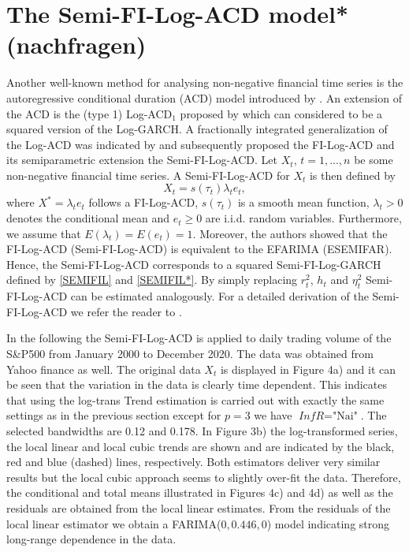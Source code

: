 \documentclass[12pt]{article}
\begin{document}
\section{The Semi-FI-Log-ACD model* (nachfragen)}
 Another well-known method for analysing non-negative financial time series is the autoregressive conditional duration (ACD) model introduced by \citet{engle1998autoregressive}. An extension of the ACD is the (type 1) Log-ACD$_1$ proposed by \citet{bauwens2008moments} which can considered to be a squared version of the Log-GARCH. A fractionally integrated generalization of the Log-ACD was indicated by \citet{beran2015modelling} and subsequently \citet{feng2015forecasting} proposed the FI-Log-ACD and its semiparametric extension the Semi-FI-Log-ACD. Let $X_t$, $t = 1,...,n$ be some non-negative financial time series. A Semi-FI-Log-ACD for $X_t$ is then defined by 
 \begin{equation}
 	X_t = s(\tau_t) \lambda_t e_t,
 \end{equation}
where $X^* = \lambda_t e_t$ follows a FI-Log-ACD, $s(\tau_t)$ is a smooth mean function, $\lambda_t > 0$ denotes the conditional mean and $e_t \geq 0$ are i.i.d. random variables. Furthermore, we assume that $E(\lambda_t) = E(e_t) = 1$. Moreover, the authors showed that the FI-Log-ACD (Semi-FI-Log-ACD) is equivalent to the EFARIMA (ESEMIFAR). Hence, the Semi-FI-Log-ACD corresponds to a squared Semi-FI-Log-GARCH defined by \eqref{SEMIFIL} and \eqref{SEMIFIL*}. By simply replacing $r_t^2$, $h_t$ and $\eta_t^2$ Semi-FI-Log-ACD can be estimated analogously. For a detailed derivation of the Semi-FI-Log-ACD we refer the reader to \citet{feng2015forecasting}.

 In the following the Semi-FI-Log-ACD is applied to daily trading volume of the S\&P500 from January 2000 to December 2020. The data was obtained from Yahoo finance as well. The original data $X_t$ is displayed in Figure 4a) and it can be seen that the variation in the data is clearly time dependent. This indicates that using the log-trans Trend estimation is carried out with exactly the same settings as in the previous section except for $p=3$ we have $\textit{InfR} = \text{"Nai"}$. The selected bandwidths are 0.12 and 0.178. In Figure 3b) the log-transformed series, the local linear and local cubic trends are shown and are indicated by the black, red and blue (dashed) lines, respectively. Both estimators deliver very similar results but the local cubic approach seems to slightly over-fit the data. Therefore, the conditional and total means illustrated in Figures 4c) and 4d) as well as the residuals are obtained from the local linear estimates. From the residuals of the local linear estimator we obtain a FARIMA($0, 0.446, 0$) model indicating strong long-range dependence in the data. 
 
\end{document}
